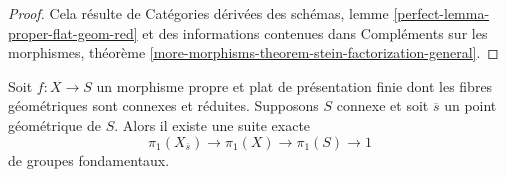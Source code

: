 \begin{proof}
Cela résulte de Catégories dérivées des schémas,
lemme \ref{perfect-lemma-proper-flat-geom-red}
et des informations contenues dans
Compléments sur les morphismes, théorème
\ref{more-morphisms-theorem-stein-factorization-general}.
\end{proof}

\begin{proposition}
\label{proposition-first-homotopy-sequence}
Soit $f : X \to S$ un morphisme propre et plat de présentation finie dont les
fibres géométriques sont connexes et réduites. Supposons $S$ connexe et
soit $\overline{s}$ un point géométrique de $S$. Alors il existe une suite
exacte
$$
\pi_1(X_{\overline{s}}) \to \pi_1(X) \to \pi_1(S) \to 1
$$
de groupes fondamentaux.
\end{proposition}

